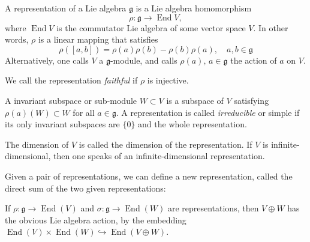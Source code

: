 \documentclass[12pt]{article}
\newcommand{\lag}{\mathfrak{g}}
\newcommand{\End}{\mathop{\mathrm{End}}\nolimits}
\begin{document}
A representation of a Lie algebra $\lag$ is a Lie algebra homomorphism
$$\rho:\lag \rightarrow \End V,$$
where $\End V$ is the commutator Lie
algebra of some vector space $V$.  In other words, $\rho$ is a linear
mapping that satisfies
$$\rho([a,b]) = \rho(a)\rho(b)-\rho(b)\rho(a),\quad a,b\in\lag$$
Alternatively, one calls $V$ a $\lag$-module, and calls $\rho(a),\,
a\in \lag$ the action of $a$ on $V$.

We call the representation {\em faithful} if $\rho$ is injective.

A invariant subspace or sub-module $W\subset V$ is a subspace of $V$ satisfying $\rho(a)(W)\subset W$ for all $a\in\lag$.  A representation is
called {\em irreducible} or simple if its only invariant subspaces are $\{0\}$
and the whole representation.

The dimension of $V$ is called the dimension of the representation.
If $V$ is infinite-dimensional, then one speaks of an
infinite-dimensional representation.

Given a pair of representations, we can define a new representation, called the direct sum of the two given representations:

If $\rho:\lag\to\End(V)$ and $\sigma:\lag\to\End(W)$ are representations, then $V\oplus W$ has the obvious Lie algebra action, by the embedding $\End(V)\times\End(W)\hookrightarrow\End(V\oplus W)$.
\end{document}
